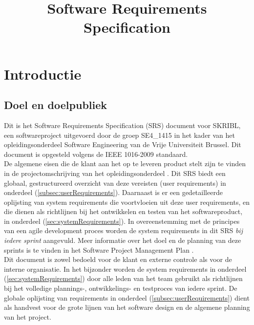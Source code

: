 \documentclass{article}
\title{Software Requirements Specification}
\author{} %
\date{} %
\begin{document}




\tableofcontents
\newpage


\section{Introductie}

\subsection{Doel en doelpubliek} %
Dit is het Software Requirements Specification (SRS) document voor SKRIBL,  een softwareproject uitgevoerd door de groep SE4\_1415 in het kader van het opleidingsonderdeel Software Engineering van de Vrije Universiteit Brussel. Dit document is opgesteld volgens de IEEE 1016-2009 standaard. \newline
\\
\noindent De algemene eisen die de klant aan het op te leveren product stelt zijn te vinden in de projectomschrijving van het opleidingsonderdeel \cite{Xtreport:organisatie}. Dit SRS biedt een globaal, gestructureerd overzicht van deze vereisten (user requirements) in onderdeel (\ref{subsec:userRequirements}). Daarnaast is er een gedetailleerde oplijsting van system requirements die voortvloeien uit deze user requirements, en die dienen als richtlijnen bij het ontwikkelen en testen van het softwareproduct, in onderdeel (\ref{sec:systemRequirements}). In overeenstemming met de principes van een agile development proces worden de system requirements in dit SRS \emph{bij iedere sprint} aangevuld. Meer informatie over het doel en de planning van deze sprints is te vinden in het Software Project Management Plan \cite{Xtreport:SPMP}. \newline
\\
\noindent Dit document is zowel bedoeld voor de klant en externe controle als voor de interne organisatie. In het bijzonder worden de system requirements in onderdeel (\ref{sec:systemRequirements}) door alle leden van het team gebruikt als richtlijnen bij het volledige plannings-, ontwikkelings- en testproces van iedere sprint. De globale oplijsting van requirements in onderdeel (\ref{subsec:userRequirements}) dient als handvest voor de grote lijnen van het software design en de algemene planning van het project.  
\end{document}
